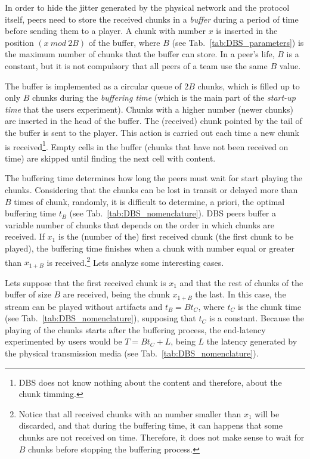 
\label{sec:buffering_chunks}

In order to hide the jitter generated by the physical network and the
protocol itself, peers need to store the received chunks in a
\emph{buffer} during a period of time before sending them to a
player. A chunk with number $x$ is inserted in the position
$(x~\mathit{mod}~2B)$ of the buffer, where $B$ (see
Tab.~\ref{tab:DBS_parameters}) is the maximum number of chunks that
the buffer can store. In a peer's life, $B$ is a constant, but it is
not compulsory that all peers of a team use the same $B$ value.

The buffer is implemented as a circular queue of $2B$ chunks, which is
filled up to only $B$ chunks during the \emph{buffering time} (which
is the main part of the \emph{start-up time} that the users
experiment). Chunks with a higher number (newer chunks) are inserted
in the head of the buffer. The (received) chunk pointed by the tail of
the buffer is sent to the player. This action is carried out each time
a new chunk is received\footnote{DBS does not know nothing about the
content and therefore, about the chunk timming.}. Empty cells in the
buffer (chunks that have not been received on time) are skipped until
finding the next cell with content.

The buffering time determines how long the peers must wait for start
playing the chunks. Considering that the chunks can be lost in transit
or delayed more than $B$ times of chunk, randomly, it is difficult to
determine, a priori, the optimal buffering time $t_B$ (see
Tab.~\ref{tab:DBS_nomenclature}). DBS peers buffer a variable number
of chunks that depends on the order in which chunks are received. If
$x_1$ is the (number of the) first received chunk (the first chunk to
be played), the buffering time finishes when a chunk with number equal
or greater than $x_{1+B}$ is received.\footnote{Notice that all
  received chunks with an number smaller than $x_1$ will be discarded,
  and that during the buffering time, it can happens that some chunks
  are not received on time. Therefore, it does not make sense to wait
  for $B$ chunks before stopping the buffering process.} Lets analyze
some interesting cases.

Lets suppose that the first received chunk is $x_1$ and that the rest
of chunks of the buffer of size $B$ are received, being the chunk
$x_{1+B}$ the last. In this case, the stream can be played without
artifacts and $t_B=Bt_C$, where $t_C$ is the chunk time (see
Tab.~\ref{tab:DBS_nomenclature}), supposing that $t_C$ is a
constant. Because the playing of the chunks starts after the buffering
process, the end-latency experimented by users would be $T=Bt_C+L$,
being $L$ the latency generated by the physical transmission media
(see Tab.~\ref{tab:DBS_nomenclature}).

